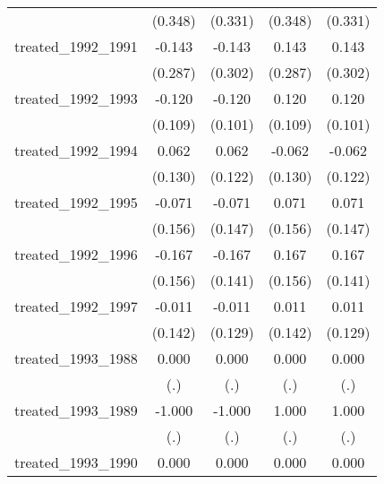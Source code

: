 {\begin{tabular}{l*{4}{c}}
            &     (0.348)         &     (0.331)         &     (0.348)         &     (0.331)         \\
[1em]
treated\_1992\_1991&      -0.143         &      -0.143         &       0.143         &       0.143         \\
            &     (0.287)         &     (0.302)         &     (0.287)         &     (0.302)         \\
[1em]
treated\_1992\_1993&      -0.120         &      -0.120         &       0.120         &       0.120         \\
            &     (0.109)         &     (0.101)         &     (0.109)         &     (0.101)         \\
[1em]
treated\_1992\_1994&       0.062         &       0.062         &      -0.062         &      -0.062         \\
            &     (0.130)         &     (0.122)         &     (0.130)         &     (0.122)         \\
[1em]
treated\_1992\_1995&      -0.071         &      -0.071         &       0.071         &       0.071         \\
            &     (0.156)         &     (0.147)         &     (0.156)         &     (0.147)         \\
[1em]
treated\_1992\_1996&      -0.167         &      -0.167         &       0.167         &       0.167         \\
            &     (0.156)         &     (0.141)         &     (0.156)         &     (0.141)         \\
[1em]
treated\_1992\_1997&      -0.011         &      -0.011         &       0.011         &       0.011         \\
            &     (0.142)         &     (0.129)         &     (0.142)         &     (0.129)         \\
[1em]
treated\_1993\_1988&       0.000         &       0.000         &       0.000         &       0.000         \\
            &         (.)         &         (.)         &         (.)         &         (.)         \\
[1em]
treated\_1993\_1989&      -1.000         &      -1.000         &       1.000         &       1.000         \\
            &         (.)         &         (.)         &         (.)         &         (.)         \\
[1em]
treated\_1993\_1990&       0.000         &       0.000         &       0.000         &       0.000         \\

\end{tabular}}
